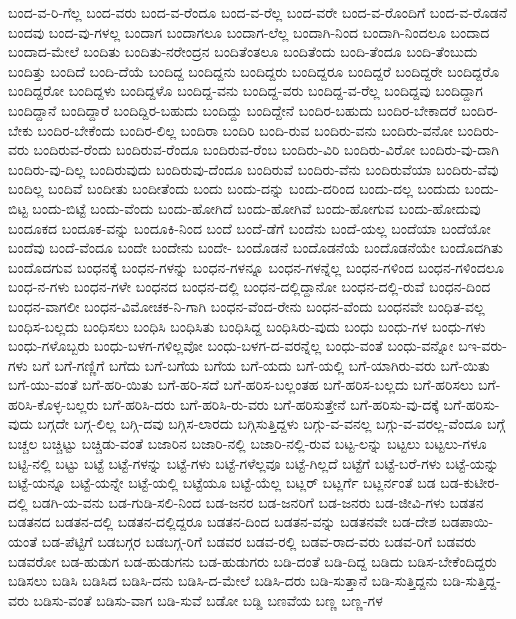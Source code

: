 {ಬಂದ-ವ-ರಿ-ಗೆಲ್ಲ
ಬಂದ-ವರು
ಬಂದ-ವ-ರೆಂದೂ
ಬಂದ-ವ-ರೆಲ್ಲ
ಬಂದ-ವರೇ
ಬಂದ-ವ-ರೊಂದಿಗೆ
ಬಂದ-ವ-ರೊಡನೆ
ಬಂದವು
ಬಂದ-ವು-ಗಳಲ್ಲ
ಬಂದಾಗ
ಬಂದಾಗಲೂ
ಬಂದಾಗ-ಲೆಲ್ಲ
ಬಂದಾಗಿ-ನಿಂದ
ಬಂದಾಗಿ-ನಿಂದಲೂ
ಬಂದಾದ
ಬಂದಾದ-ಮೇಲೆ
ಬಂದಿತು
ಬಂದಿತು-ನರೇಂದ್ರನ
ಬಂದಿತೆಂತಲೂ
ಬಂದಿತೆಂದು
ಬಂದಿ-ತೆಂದೂ
ಬಂದಿ-ತೆಂಬುದು
ಬಂದಿತ್ತು
ಬಂದಿದೆ
ಬಂದಿ-ದೆಯೆ
ಬಂದಿದ್ದ
ಬಂದಿದ್ದನು
ಬಂದಿದ್ದರು
ಬಂದಿದ್ದರೂ
ಬಂದಿದ್ದರೆ
ಬಂದಿದ್ದರೇ
ಬಂದಿದ್ದರೊ
ಬಂದಿದ್ದರೋ
ಬಂದಿದ್ದಳು
ಬಂದಿದ್ದಳೊ
ಬಂದಿದ್ದ-ವನು
ಬಂದಿದ್ದ-ವರು
ಬಂದಿದ್ದ-ವ-ರೆಲ್ಲ
ಬಂದಿದ್ದವು
ಬಂದಿದ್ದಾಗ
ಬಂದಿದ್ದಾನೆ
ಬಂದಿದ್ದಾರೆ
ಬಂದಿದ್ದಿರ-ಬಹುದು
ಬಂದಿದ್ದು
ಬಂದಿದ್ದೇನೆ
ಬಂದಿರ-ಬಹುದು
ಬಂದಿರ-ಬೇಕಾದರೆ
ಬಂದಿರ-ಬೇಕು
ಬಂದಿರ-ಬೇಕೆಂದು
ಬಂದಿರ-ಲಿಲ್ಲ
ಬಂದಿರಾ
ಬಂದಿರಿ
ಬಂದಿ-ರುವ
ಬಂದಿರು-ವನು
ಬಂದಿರು-ವನೋ
ಬಂದಿರು-ವರು
ಬಂದಿರುವ-ರೆಂದು
ಬಂದಿರುವ-ರೆಂದೂ
ಬಂದಿರುವ-ರೆಂಬ
ಬಂದಿರು-ವಿರಿ
ಬಂದಿರು-ವಿರೋ
ಬಂದಿರು-ವು-ದಾಗಿ
ಬಂದಿರು-ವು-ದಿಲ್ಲ
ಬಂದಿರುವುದು
ಬಂದಿರುವು-ದೆಂದೂ
ಬಂದಿರುವೆ
ಬಂದಿರು-ವೆನು
ಬಂದಿರುವೆಯಾ
ಬಂದಿರು-ವೆವು
ಬಂದಿಲ್ಲ
ಬಂದಿವೆ
ಬಂದೀತು
ಬಂದೀತೆಂದು
ಬಂದು
ಬಂದು-ದನ್ನು
ಬಂದು-ದರಿಂದ
ಬಂದು-ದಲ್ಲ
ಬಂದುದು
ಬಂದು-ಬಿಟ್ಟ
ಬಂದು-ಬಿಟ್ಟೆ
ಬಂದು-ವೆಂದು
ಬಂದು-ಹೋಗಿದೆ
ಬಂದು-ಹೋಗಿವೆ
ಬಂದು-ಹೋಗುವ
ಬಂದು-ಹೋದುವು
ಬಂದೂಕದ
ಬಂದೂಕ-ವನ್ನು
ಬಂದೂಕಿ-ನಿಂದ
ಬಂದೆ
ಬಂದೆ-ಡೆಗೆ
ಬಂದೆನು
ಬಂದೆ-ಯಲ್ಲ
ಬಂದೆಯಾ
ಬಂದೆಯೋ
ಬಂದೆವು
ಬಂದೆ-ವೆಂದೂ
ಬಂದೇ
ಬಂದೇನು
ಬಂದೇ-
ಬಂದೊಡನೆ
ಬಂದೊಡನೆಯೆ
ಬಂದೊಡನೆಯೇ
ಬಂದೊದಗಿತು
ಬಂದೊದಗುವ
ಬಂಧನಕ್ಕೆ
ಬಂಧನ-ಗಳನ್ನು
ಬಂಧನ-ಗಳನ್ನೂ
ಬಂಧನ-ಗಳನ್ನೆಲ್ಲ
ಬಂಧನ-ಗಳಿಂದ
ಬಂಧನ-ಗಳಿಂದಲೂ
ಬಂಧ-ನ-ಗಳು
ಬಂಧನ-ಗಳೇ
ಬಂಧನದ
ಬಂಧನ-ದಲ್ಲಿ
ಬಂಧನ-ದಲ್ಲಿದ್ದಾನೋ
ಬಂಧನ-ದಲ್ಲಿ-ರುವೆ
ಬಂಧನ-ದಿಂದ
ಬಂಧನ-ವಾಗಲೀ
ಬಂಧನ-ವಿಮೋಚಕ-ನಿ-ಗಾಗಿ
ಬಂಧನ-ವೆಂದ-ರೇನು
ಬಂಧನ-ವೆಂದು
ಬಂಧನವೇ
ಬಂಧಿತ-ವಲ್ಲ
ಬಂಧಿಸ-ಬಲ್ಲದು
ಬಂಧಿಸಲು
ಬಂಧಿಸಿ
ಬಂಧಿಸಿತು
ಬಂಧಿಸಿದ್ದ
ಬಂಧಿಸಿರು-ವುದು
ಬಂಧು
ಬಂಧು-ಗಳ
ಬಂಧು-ಗಳು
ಬಂಧು-ಗಳೊಬ್ಬರು
ಬಂಧು-ಬಳಗ-ಗಳಿಲ್ಲವೋ
ಬಂಧು-ಬಳಗ-ದ-ವರನ್ನೆಲ್ಲ
ಬಂಧು-ವಂತೆ
ಬಂಧು-ವನ್ನೋ
ಬಇ-ವರು-ಗಳು
ಬಗೆ
ಬಗೆ-ಗಣ್ಣಿಗೆ
ಬಗೆದು
ಬಗೆ-ಬಗೆಯ
ಬಗೆಯ
ಬಗೆ-ಯದು
ಬಗೆ-ಯಲ್ಲಿ
ಬಗೆ-ಯಾಗಿರು-ವರು
ಬಗೆ-ಯಿತು
ಬಗೆ-ಯು-ವಂತೆ
ಬಗೆ-ಹರಿ-ಯಿತು
ಬಗೆ-ಹರಿ-ಸದೆ
ಬಗೆ-ಹರಿಸ-ಬಲ್ಲಂತಹ
ಬಗೆ-ಹರಿಸ-ಬಲ್ಲದು
ಬಗೆ-ಹರಿಸಲು
ಬಗೆ-ಹರಿಸಿ-ಕೊಳ್ಳ-ಬಲ್ಲರು
ಬಗೆ-ಹರಿಸಿ-ದರು
ಬಗೆ-ಹರಿಸಿ-ರು-ವರು
ಬಗೆ-ಹರಿಸುತ್ತೇನೆ
ಬಗೆ-ಹರಿಸು-ವು-ದಕ್ಕೆ
ಬಗೆ-ಹರಿಸು-ವುದು
ಬಗ್ಗದೇ
ಬಗ್ಗ-ಲಿಲ್ಲ
ಬಗ್ಗಿ-ದವು
ಬಗ್ಗಿಸ-ಲಾರದು
ಬಗ್ಗಿಸುತ್ತಿದ್ದಳು
ಬಗ್ಗು-ವ-ವನಲ್ಲ
ಬಗ್ಗು-ವ-ವರಲ್ಲ-ವೆಂದೂ
ಬಗ್ಗೆ
ಬಚ್ಚಲ
ಬಚ್ಚಿಟ್ಟು
ಬಚ್ಚಿಡು-ವಂತೆ
ಬಜಾರಿನ
ಬಜಾರಿ-ನಲ್ಲಿ
ಬಜಾರಿ-ನಲ್ಲಿ-ರುವ
ಬಟ್ಟ-ಲನ್ನು
ಬಟ್ಟಲು
ಬಟ್ಟಲು-ಗಳೂ
ಬಟ್ಟಿ-ನಲ್ಲಿ
ಬಟ್ಟು
ಬಟ್ಟೆ
ಬಟ್ಟೆ-ಗಳನ್ನು
ಬಟ್ಟೆ-ಗಳು
ಬಟ್ಟೆ-ಗಳೆಲ್ಲವೂ
ಬಟ್ಟೆ-ಗಿಲ್ಲದೆ
ಬಟ್ಟೆಗೆ
ಬಟ್ಟೆ-ಬರೆ-ಗಳು
ಬಟ್ಟೆ-ಯನ್ನು
ಬಟ್ಟೆ-ಯನ್ನೂ
ಬಟ್ಟೆ-ಯನ್ನೇ
ಬಟ್ಟೆ-ಯಲ್ಲಿ
ಬಟ್ಟೆಯೂ
ಬಟ್ಟೆ-ಯೆಲ್ಲ
ಬಟ್ಲರ್
ಬಟ್ಲರ್ಗೆ
ಬಟ್ಲರ್ನಂತೆ
ಬಡ
ಬಡ-ಕುಟೀರ-ದಲ್ಲಿ
ಬಡಗಿ-ಯ-ವನು
ಬಡ-ಗುಡಿ-ಸಲಿ-ನಿಂದ
ಬಡ-ಜನರ
ಬಡ-ಜನರಿಗೆ
ಬಡ-ಜನರು
ಬಡ-ಜೀವಿ-ಗಳು
ಬಡತನ
ಬಡತನದ
ಬಡತನ-ದಲ್ಲಿ
ಬಡತನ-ದಲ್ಲಿದ್ದರೂ
ಬಡತನ-ದಿಂದ
ಬಡತನ-ವನ್ನು
ಬಡತನವೇ
ಬಡ-ದೇಶ
ಬಡಪಾಯಿ-ಯಂತೆ
ಬಡ-ಪೆಟ್ಟಿಗೆ
ಬಡಬಗ್ಗರ
ಬಡಬಗ್ಗ-ರಿಗೆ
ಬಡವರ
ಬಡವ-ರಲ್ಲಿ
ಬಡವ-ರಾದ-ವರು
ಬಡವ-ರಿಗೆ
ಬಡವರು
ಬಡವರೋ
ಬಡ-ಹುಡುಗ
ಬಡ-ಹುಡುಗನು
ಬಡ-ಹುಡುಗರು
ಬಡಿ-ದಂತೆ
ಬಡಿ-ದಿದ್ದ
ಬಡಿದು
ಬಡಿಸ-ಬೇಕೆಂದಿದ್ದರು
ಬಡಿಸಲು
ಬಡಿಸಿ
ಬಡಿಸಿದ
ಬಡಿಸಿ-ದನು
ಬಡಿಸಿ-ದ-ಮೇಲೆ
ಬಡಿಸಿ-ದರು
ಬಡಿ-ಸುತ್ತಾನೆ
ಬಡಿ-ಸುತ್ತಿದ್ದನು
ಬಡಿ-ಸುತ್ತಿದ್ದ-ವರು
ಬಡಿಸು-ವಂತೆ
ಬಡಿಸು-ವಾಗ
ಬಡಿ-ಸುವೆ
ಬಡೋ
ಬಡ್ಡಿ
ಬಣವೆಯ
ಬಣ್ಣ
ಬಣ್ಣ-ಗಳ
}
